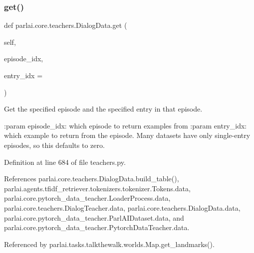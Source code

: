 \subsubsection{\texorpdfstring{get()}{get()}}
{\footnotesize\ttfamily def parlai.\+core.\+teachers.\+Dialog\+Data.\+get (\begin{DoxyParamCaption}\item[{}]{self,  }\item[{}]{episode\+\_\+idx,  }\item[{}]{entry\+\_\+idx = {} }\end{DoxyParamCaption})}

\begin{DoxyVerb}Get the specified episode and the specified entry in that episode.

:param episode_idx:
    which episode to return examples from
:param entry_idx:
    which example to return from the episode. Many datasets have only
    single-entry episodes, so this defaults to zero.
\end{DoxyVerb}
 

Definition at line 684 of file teachers.\+py.



References parlai.\+core.\+teachers.\+Dialog\+Data.\+build\+\_\+table(), parlai.\+agents.\+tfidf\+\_\+retriever.\+tokenizers.\+tokenizer.\+Tokens.\+data, parlai.\+core.\+pytorch\+\_\+data\+\_\+teacher.\+Loader\+Process.\+data, parlai.\+core.\+teachers.\+Dialog\+Teacher.\+data, parlai.\+core.\+teachers.\+Dialog\+Data.\+data, parlai.\+core.\+pytorch\+\_\+data\+\_\+teacher.\+Parl\+A\+I\+Dataset.\+data, and parlai.\+core.\+pytorch\+\_\+data\+\_\+teacher.\+Pytorch\+Data\+Teacher.\+data.



Referenced by parlai.\+tasks.\+talkthewalk.\+worlds.\+Map.\+get\+\_\+landmarks().


